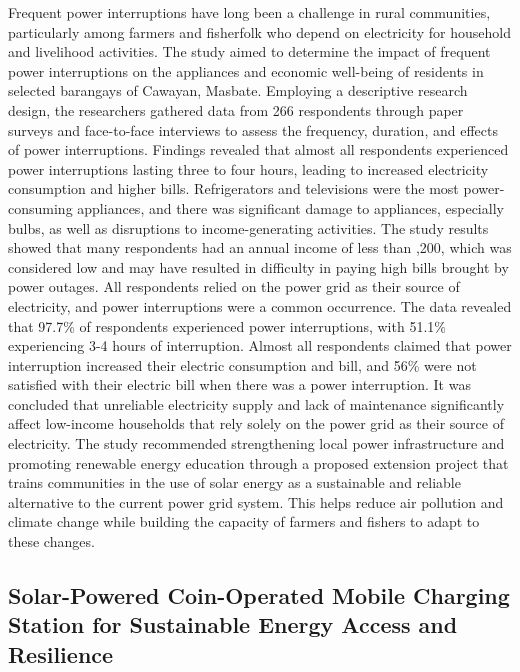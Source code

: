 {Frequent power interruptions have long been a challenge in rural communities, particularly among farmers and fisherfolk who depend on electricity for household and livelihood activities. The study aimed to determine the impact of frequent power interruptions on the appliances and economic well-being of residents in selected barangays of Cawayan, Masbate. Employing a descriptive research design, the researchers gathered data from 266 respondents through paper surveys and face-to-face interviews to assess the frequency, duration, and effects of power interruptions. Findings revealed that almost all respondents experienced power interruptions lasting three to four hours, leading to increased electricity consumption and higher bills. Refrigerators and televisions were the most power-consuming appliances, and there was significant damage to appliances, especially bulbs, as well as disruptions to income-generating activities. The study results showed that many respondents had an annual income of less than ,200, which was considered low and may have resulted in difficulty in paying high bills brought by power outages. All respondents relied on the power grid as their source of electricity, and power interruptions were a common occurrence. The data revealed that 97.7\% of respondents experienced power interruptions, with 51.1\% experiencing 3-4 hours of interruption. Almost all respondents claimed that power interruption increased their electric consumption and bill, and 56\% were not satisfied with their electric bill when there was a power interruption. It was concluded that unreliable electricity supply and lack of maintenance significantly affect low-income households that rely solely on the power grid as their source of electricity. The study recommended strengthening local power infrastructure and promoting renewable energy education through a proposed extension project that trains communities in the use of solar energy as a sustainable and reliable alternative to the current power grid system. This helps reduce air pollution and climate change while building the capacity of farmers and fishers to adapt to these changes.

\subsection{Solar-Powered Coin-Operated Mobile Charging Station for Sustainable Energy Access and Resilience}

}
